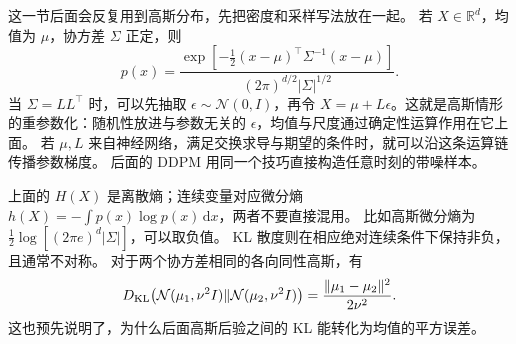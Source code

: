 这一节后面会反复用到高斯分布，先把密度和采样写法放在一起。
若 $X\in\mathbb R^d$，均值为 $\mu$，协方差 $\Sigma$ 正定，则
\[
p(x)=\frac{\exp[-\tfrac12(x-\mu)^\top\Sigma^{-1}(x-\mu)]}
 {(2\pi)^{d/2}|\Sigma|^{1/2}}.
\]
当 $\Sigma=LL^\top$ 时，可以先抽取 $\epsilon\sim\mathcal N(0,I)$，再令
$X=\mu+L\epsilon$。这就是高斯情形的重参数化：随机性放进与参数无关的
$\epsilon$，均值与尺度通过确定性运算作用在它上面。
若 $\mu,L$ 来自神经网络，满足交换求导与期望的条件时，就可以沿这条运算链传播参数梯度。
后面的 DDPM 用同一个技巧直接构造任意时刻的带噪样本。

上面的 $H(X)$ 是离散熵；连续变量对应微分熵
$h(X)=-\int p(x)\log p(x)\,\mathrm dx$，两者不要直接混用。
比如高斯微分熵为 $\tfrac12\log[(2\pi e)^d|\Sigma|]$，可以取负值。
KL 散度则在相应绝对连续条件下保持非负，且通常不对称。
对于两个协方差相同的各向同性高斯，有
\[
D_{\rm KL}\bigl(\mathcal N(\mu_1,\nu^2I)\|
 \mathcal N(\mu_2,\nu^2I)\bigr)
=\frac{\|\mu_1-\mu_2\|^2}{2\nu^2}.
\]
这也预先说明了，为什么后面高斯后验之间的 KL 能转化为均值的平方误差。
